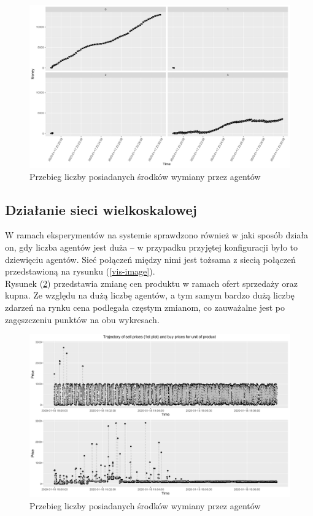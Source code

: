 \documentclass{article}
\begin{document}
\begin{figure}[H]
	\centering
	\includegraphics[width=\textwidth]{./monopoly-money.png}
	\caption{Przebieg liczby posiadanych środków wymiany przez agentów}
	\label{monopoly-money}
\end{figure}

\subsection{Działanie sieci wielkoskalowej}

W ramach eksperymentów na systemie sprawdzono również w jaki sposób działa on, gdy liczba agentów jest duża -- w przypadku przyjętej konfiguracji było to dziewięciu agentów.
Sieć połączeń między nimi jest tożsama z siecią połączeń przedstawioną na rysunku (\ref{vis-image}).\\
Rysunek (\ref{big-net-money}) przedstawia zmianę cen produktu w ramach ofert sprzedaży oraz kupna. Ze względu na dużą liczbę agentów, a tym samym bardzo dużą liczbę zdarzeń na rynku cena podlegała częstym zmianom, co zauważalne 
jest po zagęszczeniu punktów na obu wykresach.

\begin{figure}[H]
	\centering
	\includegraphics[width=\textwidth]{./big-net-money.png}
	\caption{Przebieg liczby posiadanych środków wymiany przez agentów}
	\label{big-net-money}
\end{figure}
\end{document}
